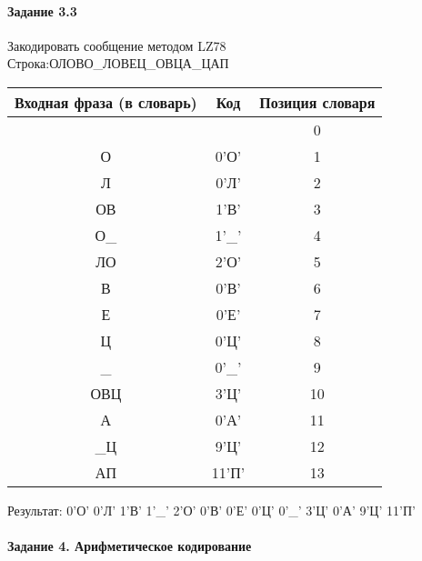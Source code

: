 \documentclass[a4paper, 12pt]{article}
\begin{document}
\paragraph{Задание 3.3}

Закодировать сообщение методом LZ78\\
Строка:ОЛОВО\_ЛОВЕЦ\_ОВЦА\_ЦАП\\
\begin{table}[h!]
\centering
\begin{tabular}{|c|c|c|} 
\hline
 Входная фраза (в словарь) & Код & Позиция словаря \\ \hline

 &  & 0 \\ \hline
О & 0'О' & 1 \\ \hline
Л & 0'Л' & 2 \\ \hline
ОВ & 1'В' & 3 \\ \hline
О\_ & 1'\_' & 4 \\ \hline
ЛО & 2'О' & 5 \\ \hline
В & 0'В' & 6 \\ \hline
Е & 0'Е' & 7 \\ \hline
Ц & 0'Ц' & 8 \\ \hline
\_ & 0'\_' & 9 \\ \hline
ОВЦ & 3'Ц' & 10 \\ \hline
А & 0'А' & 11 \\ \hline
\_Ц & 9'Ц' & 12 \\ \hline
АП & 11'П' & 13 \\ \hline
\end{tabular}
\end{table}

Результат: 0'О' 0'Л' 1'В' 1'\_' 2'О' 0'В' 0'Е' 0'Ц' 0'\_' 3'Ц' 0'А' 9'Ц' 11'П'\\
\pagebreak
\paragraph{Задание 4. Арифметическое кодирование\\}
\end{document}
